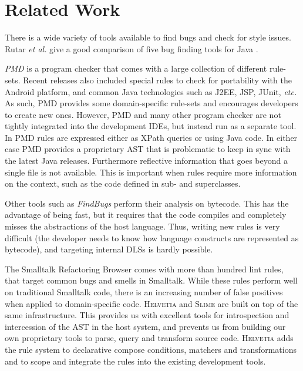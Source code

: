 \documentclass[10pt,twocolumn]{article}
\newcommand{\etc}{\emph{etc.}\xspace}
\newcommand{\etal}{\emph{et al.}\xspace}
\newcommand{\Slime}{\textsc{Slime}\xspace}
\newcommand{\Helvetia}{\textsc{Helvetia}\xspace}
\begin{document}
\section{Related Work}\label{sec:related}

There is a wide variety of tools available to find bugs and check for style issues. Rutar \etal give a good comparison of five bug finding tools for Java \cite{Ruta04a}. 

\emph{PMD} is a program checker that comes with a large collection of different rule-sets. Recent releases also included special rules to check for portability with the Android platform, and common Java technologies such as J2EE, JSP, JUnit, \etc As such, PMD provides some domain-specific rule-sets and encourages developers to create new ones. However, PMD and many other program checker are not tightly integrated into the development IDEs, but instead run as a separate tool. In PMD rules are expressed either as XPath queries or using Java code. In either case PMD provides a proprietary AST that is problematic to keep in sync with the latest Java releases. Furthermore reflective information that goes beyond a single file is not available. This is important when rules require more information on the context, such as the code defined in sub- and superclasses.

Other tools such as \emph{FindBugs} \cite{Hove04a} perform their analysis on bytecode. This has the advantage of being fast, but it requires that the code compiles and completely misses the abstractions of the host language. Thus, writing new rules is very difficult (the developer needs to know how language constructs are represented as bytecode), and targeting internal DLSs is hardly possible.

The Smalltalk Refactoring Browser \cite{Robe97a} comes with more than hundred lint rules, that target common bugs and smells in Smalltalk. While these rules perform well on traditional Smalltalk code, there is an increasing number of false positives when applied to domain-specific code. \Helvetia and \Slime are built on top of the same infrastructure. This provides us with excellent tools for introspection and intercession of the AST in the host system, and prevents us from building our own proprietary tools to parse, query and transform source code. \Helvetia adds the rule system to declarative compose conditions, matchers and transformations and to scope and integrate the rules into the existing development tools. 
\end{document}

